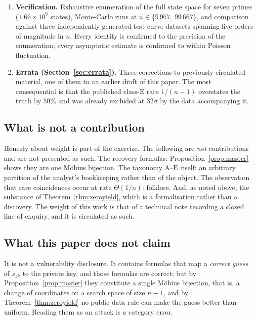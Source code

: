 \documentclass[11pt,a4paper]{article}
\theoremstyle{plain}
\theoremstyle{definition}
\theoremstyle{remark}
\newcommand{\szk}{s_{zk}}
\newcommand{\clA}{\mathrm{A}}
\newcommand{\clE}{\mathrm{E}}
\begin{document}
\begin{enumerate}[leftmargin=*,itemsep=3pt]
\item \textbf{Verification.} Exhaustive enumeration of the full state space for seven primes
  ($1.66\times10^{9}$ states), Monte-Carlo runs at $n \in \{9\,967,\ 99\,667\}$, and comparison
  against three independently generated test-curve datasets spanning five orders of magnitude in
  $n$. Every identity is confirmed to the precision of the enumeration; every asymptotic estimate
  is confirmed to within Poisson fluctuation.

\item \textbf{Errata (Section~\ref{sec:errata}).} Three corrections to previously circulated
  material, one of them to an earlier draft of this paper. The most consequential is that the
  published class-$\clE$ rate $1/(n-1)$ overstates the truth by $50\%$ and was already excluded at
  $32\sigma$ by the data accompanying it.
\end{enumerate}

\subsection{What is not a contribution}

Honesty about weight is part of the exercise. The following are \emph{not} contributions and are
not presented as such. The recovery formulas: Proposition~\ref{prop:master} shows they are one
M\"obius bijection. The taxonomy $\clA$--$\clE$ itself: an arbitrary partition of the analyst's
bookkeeping rather than of the object. The observation that rare coincidences occur at rate
$\Theta(1/n)$: folklore. And, as noted above, the substance of
Theorem~\ref{thm:zeroyield}, which is a formalisation rather than a discovery. The weight of this
work is that of a technical note recording a closed line of enquiry, and it is circulated as
such.

\subsection{What this paper does not claim}

It is not a vulnerability disclosure. It contains formulas that map a \emph{correct guess} of
$\szk$ to the private key, and those formulas are correct; but by Proposition~\ref{prop:master}
they constitute a single M\"obius bijection, that is, a change of coordinates on a search space of
size $n-1$, and by Theorem~\ref{thm:zeroyield} no public-data rule can make the guess better than
uniform. Reading them as an attack is a category error.
\end{document}
